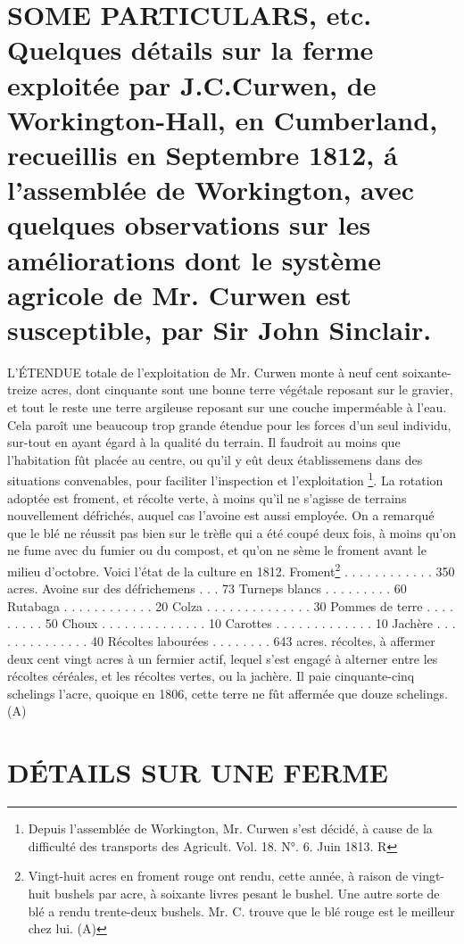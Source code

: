 \setcounter{page}{201}
\section{SOME PARTICULARS, etc. Quelques détails sur la ferme exploitée par J.C.Curwen, de Workington-Hall, en Cumberland, recueillis en Septembre 1812, á l'assemblée de Workington, avec quelques observations sur les améliorations dont le système agricole de Mr. Curwen est susceptible, par Sir John Sinclair.}

L'ÉTENDUE totale de l'exploitation de Mr. Curwen monte à neuf cent soixante-treize acres, dont cinquante sont une bonne terre végétale reposant sur le gravier, et tout le reste une terre argileuse reposant sur une couche imperméable à l'eau. Cela paroît une beaucoup trop grande étendue pour les forces d'un seul individu, sur-tout en ayant égard à la qualité du terrain. Il faudroit au moins que l'habitation fût placée au centre, ou qu'il y eût deux établissemens dans des situations convenables, pour faciliter l'inspection et l'exploitation \footnote{Depuis l'assemblée de Workington, Mr. Curwen s'est décidé, à cause de la difficulté des transports des Agricult. Vol. 18. N°. 6. Juin 1813. R}.\setcounter{page}{202} La rotation adoptée est froment, et récolte verte, à moins qu'il ne s'agisse de terrains nouvellement défrichés, auquel cas l'avoine est aussi employée. On a remarqué que le blé ne réussit pas bien sur le trèfle qui a été coupé deux fois, à moins qu'on ne fume avec du fumier ou du compost, et qu'on ne sème le froment avant le milieu d'octobre. Voici l'état de la culture en 1812.
Froment\footnote{Vingt-huit acres en froment rouge ont rendu, cette année, à raison de vingt-huit bushels par acre, à soixante livres pesant le bushel. Une autre sorte de blé a rendu trente-deux bushels. Mr. C. trouve que le blé rouge est le meilleur chez lui. (A)} . . . . . . . . . . . . 350 acres.
Avoine sur des défrichemens . . . 73
Turneps blancs . . . . . . . . . 60
Rutabaga . . . . . . . . . . . . 20
Colza . . . . . . . . . . . . . . 30
Pommes de terre . . . . . . . . . 50
Choux . . . . . . . . . . . . . . 10
Carottes . . . . . . . . . . . . . 10
Jachère . . . . . . . . . . . . . . 40
Récoltes labourées . . . . . . . . 643 acres.
récoltes, à affermer deux cent vingt acres à un fermier actif, lequel s'est engagé à alterner entre les récoltes céréales, et les récoltes vertes, ou la jachère. Il paie cinquante-cinq schelings l'acre, quoique en 1806, cette terre ne fût affermée que douze schelings. (A)\setcounter{page}{203} \section{DÉTAILS SUR UNE FERME}
